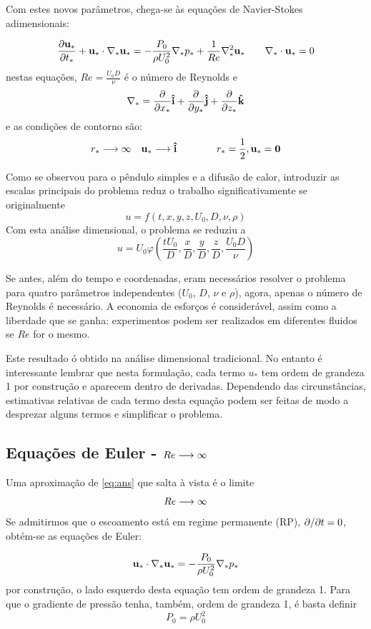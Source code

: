 Com estes novos parâmetros, chega-se às equações de Navier-Stokes adimensionais:

\begin{equation}
\frac{\partial \mathbf{u}_*}{\partial t_*} +  \mathbf{u}_*\cdot\nabla_* \mathbf{u_*} = -\frac{P_0}{\rho U_0^2}\nabla_* p_* + \frac{1}{Re}\nabla_*^2 \mathbf{u}_* \qquad \nabla_*\cdot \mathbf{u}_* = 0
\label{eq:ans}
\end{equation}
nestas equações, $Re = \frac{U_0 D}{\nu}$ é o número de Reynolds e 
\[
\nabla_* = \frac{\partial}{\partial x_*}  \mathbf{\hat{i}} + \frac{\partial}{\partial y_*}  \mathbf{\hat{j}} + \frac{\partial}{\partial z_*}  \mathbf{\hat{k}}
\]
e as condições de contorno são:
\[
 r_*\longrightarrow\infty \quad  \mathbf{u}_*\longrightarrow  \mathbf{\hat{i}} \qquad\qquad r_*=\frac{1}{2},  \mathbf{u}_* =  \mathbf{0}
\]

Como se observou para o pêndulo simples e a difusão de calor, introduzir as escalas principais do problema reduz o trabalho significativamente se originalmente
\[
u = f(t, x, y, z, U_0, D, \nu, \rho)
\]
Com esta análise dimensional, o problema se reduziu a 
\[
u = U_0 \varphi\left(\frac{t U_0}{D}, \frac{x}{D}, \frac{y}{D}, \frac{z}{D}, \frac{U_0 D}{\nu}\right)
\]

Se antes, além do tempo e coordenadas,  eram  necessários resolver o problema para quatro parâmetros independentes ($U_0$, $D$, $\nu$ e $\rho$), agora, apenas o número de Reynolds é necessário. A economia de esforços é considerável, assim como a liberdade que se ganha: experimentos podem ser realizados em diferentes fluidos se $Re$ for o mesmo.

Este resultado ó obtido na análise dimensional tradicional. No entanto é interessante lembrar que nesta formulação, cada termo $u_*$ tem ordem de grandeza 1 por construção e aparecem dentro de derivadas. Dependendo das circunstâncias, estimativas relativas de cada termo desta equação podem ser feitas de modo a desprezar alguns termos e simplificar o problema.

\subsection{Equações de Euler - $Re\longrightarrow\infty$}

Uma aproximação de \ref{eq:ans} que salta à vista é o limite 
\[
Re \longrightarrow\infty
\]
Se admitirmos que o escoamento está em regime permanente (RP), $\partial/\partial t = 0$, obtém-se as equações de Euler:

\begin{equation}
\p{u}_*\cdot\nabla_*\p{u_*} = -\frac{P_0}{\rho U_0^2}\nabla_* p_* %
\label{eq:euler}
\end{equation}
por construção, o lado esquerdo desta equação tem ordem de grandeza 1. Para que o gradiente de pressão tenha, também, ordem de grandeza 1, é basta definir  
\[
P_0 = \rho U_0^2
\]

